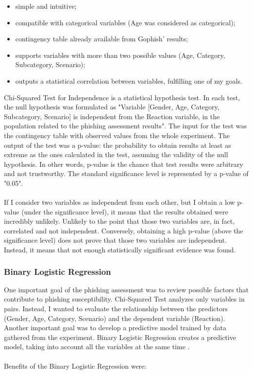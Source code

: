 \documentclass[a4paper]{article}
\begin{document}
\begin{itemize}
    \item simple and intuitive;
    \item compatible with categorical variables (Age was considered as categorical);
    \item contingency table already available from Gophish' results;
    \item supports variables with more than two possible values (Age, Category, Subcategory, Scenario);
    \item outputs a statistical correlation between variables, fulfilling one of my goals.
\end{itemize}

Chi-Squared Test for Independence is a statistical hypothesis test. In each test, the null hypothesis was formulated as "Variable [Gender, Age, Category, Subcategory, Scenario] is independent from the Reaction variable, in the population related to the phishing assessment results". The input for the test was the contingency table with observed values from the whole experiment. The output of the test was a p-value: the probability to obtain results at least as extreme as the ones calculated in the test, assuming the validity of the null hypothesis. In other words, p-value is the chance that test results were arbitrary and not trustworthy. The standard significance level is represented by a p-value of "0.05".
\\ \\
If I consider two variables as independent from each other, but I obtain a low p-value (under the significance level), it means that the results obtained were incredibly unlikely. Unlikely to the point that those two variables are, in fact, correlated and not independent. Conversely, obtaining a high p-value (above the significance level) does not prove that those two variables are independent. Instead, it means that not enough statistically significant evidence was found.

\subsubsection{Binary Logistic Regression}

One important goal of the phishing assessment was to review possible factors that contribute to phishing susceptibility. Chi-Squared Test analyzes only variables in pairs. Instead, I wanted to evaluate the relationship between the predictors (Gender, Age, Category, Scenario) and the dependent variable (Reaction). Another important goal was to develop a predictive model trained by data gathered from the experiment. Binary Logistic Regression creates a predictive model, taking into account all the variables at the same time \cite{stats-binary-logistic-regression}. 
\\ \\
Benefits of the Binary Logistic Regression were:
\end{document}
